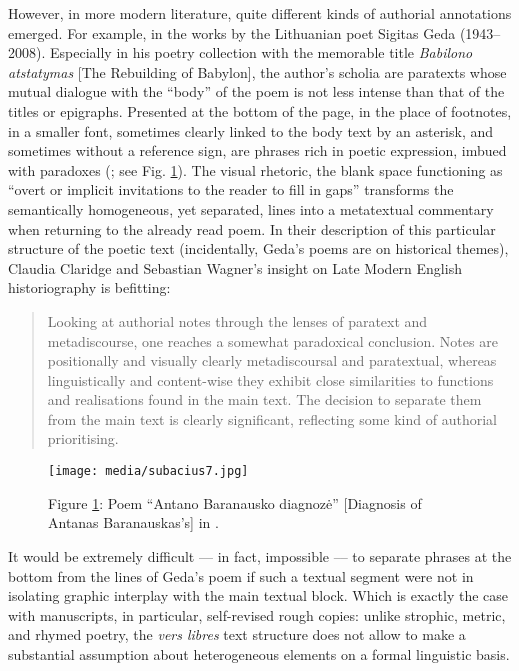 \documentclass{article}
\begin{document}
However, in more modern literature, quite different kinds of authorial
annotations emerged. For example, in the works by the Lithuanian poet
Sigitas Geda (1943--2008). Especially in his poetry collection with the
memorable title \emph{Babilono atstatymas} {[}The Rebuilding of
Babylon{]}, the author's scholia are paratexts whose mutual dialogue
with the ``body'' of the poem is not less intense than that of the
titles or epigraphs. Presented at the bottom of the page, in the place
of footnotes, in a smaller font, sometimes clearly linked to the body
text by an asterisk, and sometimes without a reference sign, are phrases
rich in poetic expression, imbued with paradoxes (\citealt[5 and 8]{geda_babilono_1994};
see Fig. \ref{fig:subacius7}). The visual rhetoric, the blank space functioning
as ``overt or implicit invitations to the reader to fill in gaps'' \citep[18]{maguire_rhetoric_2020}
transforms the semantically homogeneous, yet separated, lines into a
metatextual commentary when returning to the already read poem. In their description of this particular structure of the
poetic text (incidentally, Geda's poems are on historical themes),
Claudia Claridge and Sebastian Wagner's insight on Late Modern English
historiography is befitting:

\begin{quote}
Looking at authorial notes through the lenses of paratext and
metadiscourse, one reaches a somewhat paradoxical conclusion. Notes are
positionally and visually clearly metadiscoursal and paratextual,
whereas linguistically and content-wise they exhibit close similarities
to functions and realisations found in the main text. The decision to
separate them from the main text is clearly significant, reflecting some
kind of authorial prioritising.
\begin{flushright}
\citep[69]{claridge_footnote_2020}
\end{flushright}
\end{quote}

\begin{figure}[!p]
    \centering
    \texttt{[image: media/subacius7.jpg]}
    \caption{Figure \ref{fig:subacius7}: Poem ``Antano Baranausko diagnozė'' {[}Diagnosis of Antanas Baranauskas's{]} in \citealt[8]{geda_babilono_1994}.}
    \label{fig:subacius7}
\end{figure}

It would be extremely difficult –– in fact, impossible –– to separate
phrases at the bottom from the lines of Geda's poem if such a textual
segment were not in isolating graphic interplay with the main textual
block. Which is exactly the case with manuscripts, in particular,
self-revised rough copies: unlike
strophic, metric, and rhymed poetry, the \emph{vers libres} text
structure does not allow to make a substantial assumption about
heterogeneous elements on a formal linguistic basis.
\end{document}
